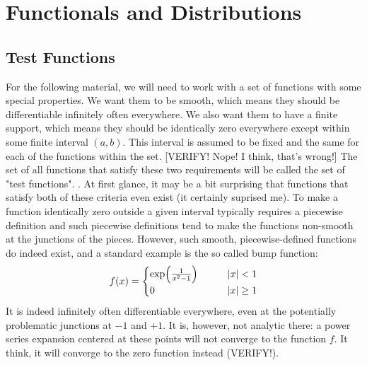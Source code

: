 \section{Functionals and Distributions} 

\label{Sec:TestFunctions}
\subsection{Test Functions}
For the following material, we will need to work with a set of functions with some special properties. We want them to be smooth, which means they should be differentiable infinitely often everywhere. We also want them to have a finite support, which means they should be identically zero everywhere except within some finite interval $(a,b)$. This interval is assumed to be fixed and the same for each of the functions within the set. [VERIFY! Nope! I think, that's wrong!] The set of all functions that satisfy these two requirements will be called the set of "test functions". . At first glance, it may be a bit surprising that functions that satisfy both of these criteria even exist (it certainly suprised me). To make a function identically zero outside a given interval typically requires a piecewise definition and such piecewise definitions tend to make the functions non-smooth at the junctions of the pieces. However, such smooth, piecewise-defined functions do indeed exist, and a standard example is the so called bump function:
\begin{equation}
f(x) = 
 \begin{cases}
 \exp \Bigl( \frac{1}{x^2-1} \Bigr)  \qquad &  |x|   <  1 \\
 0                                   \qquad &  |x| \geq 1
 \end{cases}
\end{equation}
It is indeed infinitely often differentiable everywhere, even at the potentially problematic junctions at $-1$ and $+1$. It is, however, not analytic there: a power series expansion centered at these points will not converge to the function $f$. It think, it will converge to the zero function instead (VERIFY!).



